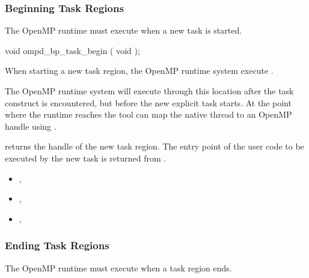 \subsubsection{Beginning Task Regions}
\label{subsubsec:ompd_bp_task_begin}

The OpenMP runtime must execute 
 when a new task is started.


\format
\begin{cspecific}
\begin{ompSyntax}
void ompd_bp_task_begin ( void );
\end{ompSyntax}
\end{cspecific}


\descr

When starting a new task region, the OpenMP runtime system
execute .

The OpenMP runtime system will execute through this location after the task
construct is encountered, but before the new explicit task starts.
At the point where the runtime reaches 
the tool can map the native thread to an OpenMP handle using
.

 returns the handle of the new task region.
The entry point of the user code to be executed by the new task
is returned from
.


\crossreferences
\begin{itemize}
\item
  , 
\item
  , 
\item
  , 
\end{itemize}





\subsubsection{Ending Task Regions}
\label{subsubsec:ompd_bp_task_end}

\summary
The OpenMP runtime must execute 
when a task region ends.


